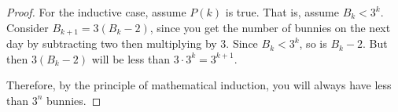 \documentclass[10pt]{exam}
\def\d{\displaystyle}
\begin{document}
\begin{questions}
\begin{solution}
\begin{proof}
    For the inductive case, assume $P(k)$ is true.  That is, assume $B_k < 3^k$.  Consider $B_{k+1} = 3(B_k - 2)$, since you get the number of bunnies on the next day by subtracting two then multiplying by 3.    Since $B_k < 3^k$, so is $B_k-2$.  But then $3(B_k-2)$ will be less than $3\cdot 3^k = 3^{k+1}$.
    
    Therefore, by the principle of mathematical induction, you will always have less than $3^n$ bunnies.  
  \end{proof}
\end{solution}

% 
% 
% 

\end{questions}
\end{document}
